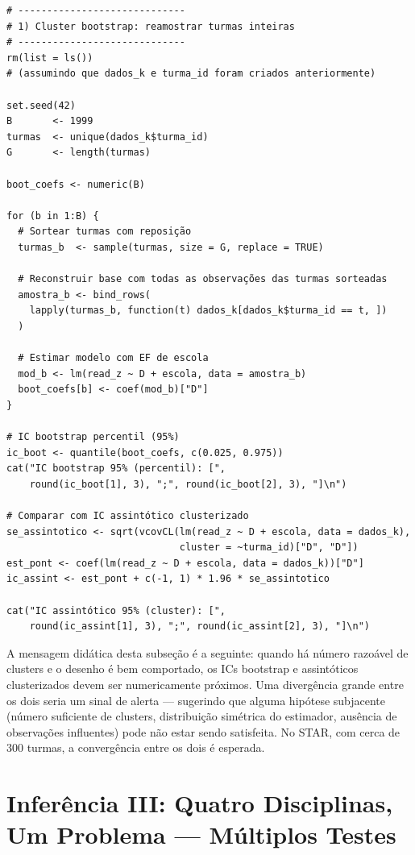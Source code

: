 \begin{lstlisting}[style=Rstyle, caption={Cluster bootstrap por turma no STAR}]
# -----------------------------
# 1) Cluster bootstrap: reamostrar turmas inteiras
# -----------------------------
rm(list = ls())
# (assumindo que dados_k e turma_id foram criados anteriormente)

set.seed(42)
B       <- 1999
turmas  <- unique(dados_k$turma_id)
G       <- length(turmas)

boot_coefs <- numeric(B)

for (b in 1:B) {
  # Sortear turmas com reposição
  turmas_b  <- sample(turmas, size = G, replace = TRUE)

  # Reconstruir base com todas as observações das turmas sorteadas
  amostra_b <- bind_rows(
    lapply(turmas_b, function(t) dados_k[dados_k$turma_id == t, ])
  )

  # Estimar modelo com EF de escola
  mod_b <- lm(read_z ~ D + escola, data = amostra_b)
  boot_coefs[b] <- coef(mod_b)["D"]
}

# IC bootstrap percentil (95%)
ic_boot <- quantile(boot_coefs, c(0.025, 0.975))
cat("IC bootstrap 95% (percentil): [",
    round(ic_boot[1], 3), ";", round(ic_boot[2], 3), "]\n")

# Comparar com IC assintótico clusterizado
se_assintotico <- sqrt(vcovCL(lm(read_z ~ D + escola, data = dados_k),
                              cluster = ~turma_id)["D", "D"])
est_pont <- coef(lm(read_z ~ D + escola, data = dados_k))["D"]
ic_assint <- est_pont + c(-1, 1) * 1.96 * se_assintotico

cat("IC assintótico 95% (cluster): [",
    round(ic_assint[1], 3), ";", round(ic_assint[2], 3), "]\n")
\end{lstlisting}

A mensagem didática desta subseção é a seguinte: quando há número razoável de clusters e o desenho é bem comportado, os ICs bootstrap e assintóticos clusterizados devem ser numericamente próximos. Uma divergência grande entre os dois seria um sinal de alerta --- sugerindo que alguma hipótese subjacente (número suficiente de clusters, distribuição simétrica do estimador, ausência de observações influentes) pode não estar sendo satisfeita. No STAR, com cerca de 300 turmas, a convergência entre os dois é esperada.


\section{Inferência III: Quatro Disciplinas, Um Problema --- Múltiplos Testes}
\label{sec:star_multiplos}

